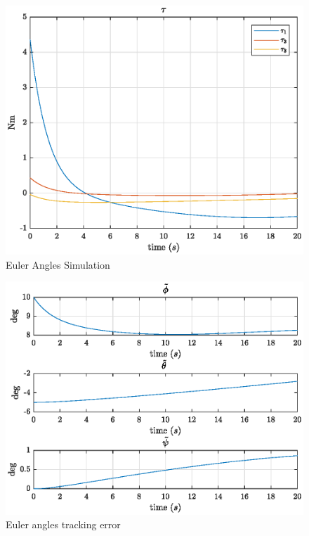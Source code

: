 \begin{figure}
    \centering
    \includegraphics[scale=0.8]{tau3.eps}
    \caption{Euler Angles Simulation}
    \label{fig:tau3}
\end{figure}



\begin{figure}[h!]
    \centering
  \includegraphics[scale=0.8]{eulang_tilde.eps}
  \caption{Euler angles tracking error}
  \label{fig:eulang:tilde1}
\end{figure}